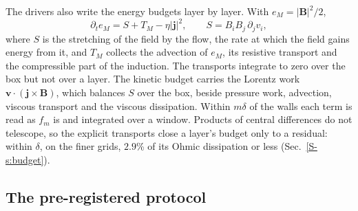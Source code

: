 \documentclass[aip,pop,reprint,amsmath,amssymb,superscriptaddress,floatfix]{revtex4-2}
\newcommand{\vv}{\bm{v}}
\newcommand{\BB}{\bm{B}}
\begin{document}
The drivers also write the energy budgets layer by layer. With $e_M=|\BB|^2/2$,
\begin{equation}
  \partial_t e_M = S + T_M - \eta|\bm{j}|^2, \qquad S = B_iB_j\,\partial_j v_i,
  \label{eq:budget}
\end{equation}
where $S$ is the stretching of the field by the flow, the rate at which the field
gains energy from it, and $T_M$ collects the advection of $e_M$, its resistive
transport and the compressible part of the induction. The transports integrate to
zero over the box but not over a layer. The kinetic budget carries the Lorentz work
$\vv\cdot(\bm{j}\times\BB)$, which balances $S$ over the box, beside pressure work,
advection, viscous transport and the viscous dissipation. Within $m\delta$ of the
walls each term is read as $f_m$ is and integrated over a window. Products of
central differences do not telescope, so the explicit transports close a layer's
budget only to a residual: within $\delta$, on the finer grids, $2.9$\% of its Ohmic
dissipation or less (Sec.~\ref{S-s:budget}).

\subsection{The pre-registered protocol}
\label{sec:protocol}
\end{document}
